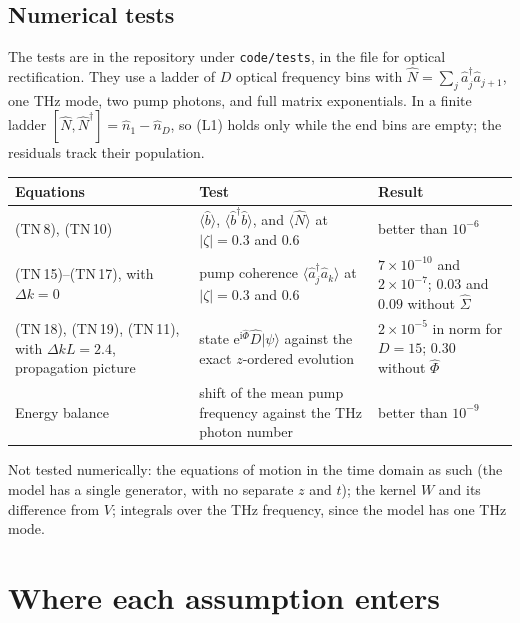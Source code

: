 \documentclass[aps,pra,onecolumn,notitlepage,11pt,amsmath,amssymb,nofootinbib]{revtex4-2}
\newcommand{\Nop}{\hat N}
\newcommand{\ee}{\mathrm{e}}
\newcommand{\ii}{\mathrm{i}}
\begin{document}
\subsection{Numerical tests}

The tests are in the repository under \texttt{code/tests}, in the file for
optical rectification. They use a ladder of $D$ optical frequency bins with
$\Nop=\sum_j\hat a_j^\dagger\hat a_{j+1}$, one THz mode, two pump photons, and
full matrix exponentials. In a finite ladder
$[\Nop,\Nop^\dagger]=\hat n_1-\hat n_D$, so (L1) holds only while the end bins
are empty; the residuals track their population.

\begin{center}
\begin{tabular}{R{0.24\textwidth}R{0.38\textwidth}R{0.30\textwidth}}
\hline\hline
Equations & Test & Result\\
\hline
(TN\,8), (TN\,10) & $\langle\hat b\rangle$, $\langle\hat b^\dagger\hat b\rangle$, and $\langle\Nop\rangle$ at $|\zeta|=0.3$ and $0.6$ &
 better than $10^{-6}$\\[4pt]
(TN\,15)--(TN\,17), with $\Delta k=0$ & pump coherence $\langle\hat a_j^\dagger\hat a_k\rangle$ at $|\zeta|=0.3$ and $0.6$ &
 $7\times10^{-10}$ and $2\times10^{-7}$; $0.03$ and $0.09$ without $\hat\Sigma$\\[4pt]
(TN\,18), (TN\,19), (TN\,11), with $\Delta kL=2.4$, propagation picture & state $\ee^{\ii\hat\Phi}\hat D|\psi\rangle$ against the exact $z$-ordered evolution &
 $2\times10^{-5}$ in norm for $D=15$; $0.30$ without $\hat\Phi$\\[4pt]
Energy balance & shift of the mean pump frequency against the THz photon number &
 better than $10^{-9}$\\
\hline\hline
\end{tabular}
\end{center}

Not tested numerically: the equations of motion in the time domain as such
(the model has a single generator, with no separate $z$ and $t$); the kernel
$W$ and its difference from $V$; integrals over the THz frequency, since the
model has one THz mode.

\section{Where each assumption enters}
\label{sec:assume}
\end{document}
